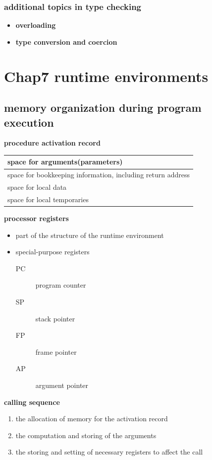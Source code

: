 \documentclass[11pt]{article}
\begin{document}
\subsubsection{additional topics in type checking}
\label{sec:orga04e2d4}
\begin{itemize}
\item \textbf{overloading}
\item \textbf{type conversion and coercion}
\end{itemize}
\section{Chap7 runtime environments}
\label{sec:orgcebb9d9}
\subsection{memory organization during program execution}
\label{sec:orgd8c9ffd}
\textbf{procedure activation record}
\begin{center}
\begin{tabular}{l}
space for arguments(parameters)\\
\hline
space for bookkeeping information, including return address\\
\hline
space for local data\\
\hline
space for local temporaries\\
\end{tabular}
\end{center}

\textbf{processor registers}
\begin{itemize}
\item part of the structure of the runtime environment
\item special-purpose registers
\begin{description}
\item[{PC}] program counter
\item[{SP}] stack pointer
\item[{FP}] frame pointer
\item[{AP}] argument pointer
\end{description}
\end{itemize}

\textbf{calling sequence}
\begin{enumerate}
\item the allocation of memory for the activation record
\item the computation and storing of the arguments
\item the storing and setting of necessary registers to affect the call
\end{enumerate}
\end{document}

